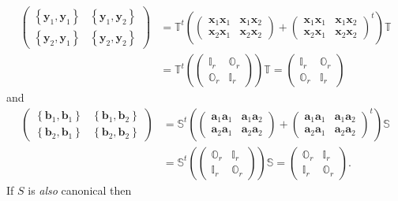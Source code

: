 \documentclass[aps, preprint]{revtex4}
\begin{document}
\begin{align}\left (\begin{array}{cc}\left \{\mathbf{y}_{1} ,\mathbf{y}_{1}\right \} & \left \{\mathbf{y}_{1} ,\mathbf{y}_{2}\right \} \\
\left \{\mathbf{y}_{2} ,\mathbf{y}_{1}\right \} & \left \{\mathbf{y}_{2} ,\mathbf{y}_{2}\right \}\end{array}\right ) &  =\mathbb{T}^{t} \left (\left (\begin{array}{cc}\mathbf{x}_{1} \mathbf{x}_{1} & \mathbf{x}_{1} \mathbf{x}_{2} \\
\mathbf{x}_{2} \mathbf{x}_{1} & \mathbf{x}_{2} \mathbf{x}_{2}\end{array}\right ) +\left (\begin{array}{cc}\mathbf{x}_{1} \mathbf{x}_{1} & \mathbf{x}_{1} \mathbf{x}_{2} \\
\mathbf{x}_{2} \mathbf{x}_{1} & \mathbf{x}_{2} \mathbf{x}_{2}\end{array}\right )^{t}\right ) \mathbb{T} \nonumber  \\
 &  =\mathbb{T}^{t} \left (\left (\begin{array}{cc}\mathbb{I}_{r} & \mathbb{O}_{r} \\
\mathbb{O}_{r} & \mathbb{I}_{r}\end{array}\right )\right ) \mathbb{T} =\left (\begin{array}{cc}\mathbb{I}_{r} & \mathbb{O}_{r} \\
\mathbb{O}_{r} & \mathbb{I}_{r}\end{array}\right )\end{align}and
\begin{align}\left (\begin{array}{cc}\left \{\mathbf{b}_{1} ,\mathbf{b}_{1}\right \} & \left \{\mathbf{b}_{1} ,\mathbf{b}_{2}\right \} \\
\left \{\mathbf{b}_{2} ,\mathbf{b}_{1}\right \} & \left \{\mathbf{b}_{2} ,\mathbf{b}_{2}\right \}\end{array}\right ) &  =\mathbb{S}^{t} \left (\left (\begin{array}{cc}\mathbf{a}_{1} \mathbf{a}_{1} & \mathbf{a}_{1} \mathbf{a}_{2} \\
\mathbf{a}_{2} \mathbf{a}_{1} & \mathbf{a}_{2} \mathbf{a}_{2}\end{array}\right ) +\left (\begin{array}{cc}\mathbf{a}_{1} \mathbf{a}_{1} & \mathbf{a}_{1} \mathbf{a}_{2} \\
\mathbf{a}_{2} \mathbf{a}_{1} & \mathbf{a}_{2} \mathbf{a}_{2}\end{array}\right )^{t}\right ) \mathbb{S} \nonumber  \\
 &  =\mathbb{S}^{t} \left (\left (\begin{array}{cc}\mathbb{O}_{r} & \mathbb{I}_{r} \\
\mathbb{I}_{r} & \mathbb{O}_{r}\end{array}\right )\right ) \mathbb{S} =\left (\begin{array}{cc}\mathbb{O}_{r} & \mathbb{I}_{r} \\
\mathbb{I}_{r} & \mathbb{O}_{r}\end{array}\right )\text{.}\end{align}If $S$ is \emph{also} canonical then
\end{document}

